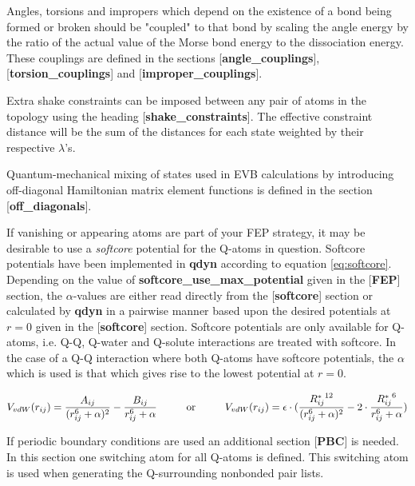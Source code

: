 \documentclass[a4paper,10pt]{article}
\begin{document}
Angles, torsions and impropers which depend on the existence of a bond
being formed or broken should be "coupled" to that bond by scaling the
angle energy by the ratio of the actual value of the Morse bond energy
to  the  dissociation  energy.  These couplings  are  defined  in  the
sections   [\textbf{angle\_couplings}],  [\textbf{torsion\_couplings}]
and [\textbf{improper\_couplings}].

Extra shake  constraints can be imposed  between any pair of  atoms in
the  topology using  the  heading [\textbf{shake\_constraints}].   The
effective constraint  distance will  be the sum  of the  distances for
each state weighted by their respective $\lambda$'s.

Quantum-mechanical  mixing  of  states  used in  EVB  calculations  by
introducing  off-diagonal  Hamiltonian  matrix  element  functions  is
defined in the section [\textbf{off\_diagonals}].

If vanishing or appearing atoms are  part of your FEP strategy, it may
be desirable to  use a \textit{softcore} potential for  the Q-atoms in
question.\cite{Zacharias:1994}    Softcore   potentials    have   been
implemented in \textbf{qdyn}  according to equation \ref{eq:softcore}.
Depending on the value of \textbf{softcore\-\_use\-\_max\-\_potential}
given in  the [\textbf{FEP}]  section, the $\alpha$-values  are either
read directly  from the  [\textbf{softcore}] section or  calculated by
\textbf{qdyn} in a  pairwise manner based upon  the desired potentials
at $r=0$ given in the [\textbf{softcore}] section. Softcore potentials
are  only  available  for  Q-atoms, i.e.  Q-Q,  Q-water  and  Q-solute
interactions  are  treated  with  softcore.  In  the  case  of  a  Q-Q
interaction where both Q-atoms  have softcore potentials, the $\alpha$
which is  used is  that which  gives rise to  the lowest  potential at
$r=0$.

\begin {equation}
\label{eq:softcore}
 V_{vdW}(r_{ij}) = \frac{A_{ij}}{(r_{ij}^6 + \alpha)^2} - \frac{B_{ij}}{r_{ij}^6 +
 \alpha}
 \text{\hspace{1cm}or\hspace{1cm}}
 V_{vdW}(r_{ij}) = \epsilon\cdot(\frac{{R_{ij}^{*}}^{12}}{(r_{ij}^6 + \alpha)^2} - 2\cdot\frac{{R_{ij}^{*}}^{6}}{r_{ij}^6 + \alpha})
\end{equation}

If  periodic  boundary  conditions  are  used  an  additional  section
[\textbf{PBC}] is needed.  In this section one switching  atom for all
Q-atoms is  defined. This switching  atom is used when  generating the
Q-surrounding nonbonded pair lists.
\end{document}
